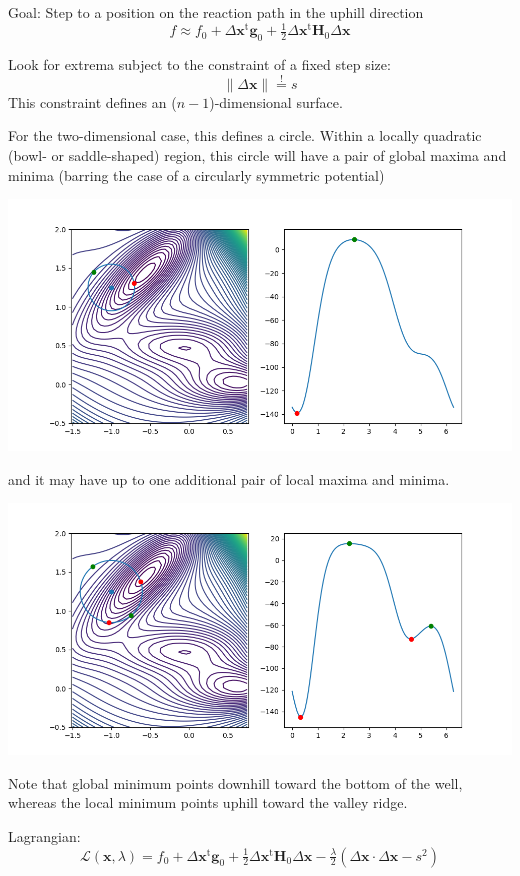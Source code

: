 \documentclass[11pt]{article}
\begin{document}
\noindent
Goal: Step to a position on the reaction path in the uphill direction
\[
    f
    \approx
    f_0
    +
    \Delta\mathbf{x}^\mathrm{t}
    \mathbf{g}_0
    +
    \tfrac{1}{2}
    \Delta\mathbf{x}^\mathrm{t}
    \mathbf{H}_0
    \Delta\mathbf{x}
\]

\noindent
Look for extrema subject to the constraint of a fixed step size:
\[
    \|\Delta\mathbf{x}\|
    \overset{!}{=}
    s
\]
This constraint defines an (\(n-1\))-dimensional surface.

For the two-dimensional case, this defines a circle.
Within a locally quadratic (bowl- or saddle-shaped) region, this circle will
have a pair of global maxima and minima 
(barring the case of a circularly symmetric potential)
\begin{center}
    \includegraphics[width=0.8\linewidth]{figs/potential03.png}
\end{center}
and it may have up to one additional pair of local maxima and minima.
\begin{center}
    \includegraphics[width=0.8\linewidth]{figs/potential04.png}
\end{center}
Note that global minimum points downhill toward the bottom of the well, whereas
the local minimum points uphill toward the valley ridge.

\noindent
Lagrangian:
\[
    \mathcal{L}(\mathbf{x}, \lambda)
    =
    f_0
    +
    \Delta\mathbf{x}^\mathrm{t}
    \mathbf{g}_0
    +
    \tfrac{1}{2}
    \Delta\mathbf{x}^\mathrm{t}
    \mathbf{H}_0
    \Delta\mathbf{x}
    -
    \tfrac{\lambda}{2}
    (
        \Delta\mathbf{x}\cdot\Delta\mathbf{x}
        -
        s^2
    )
\]
\end{document}
